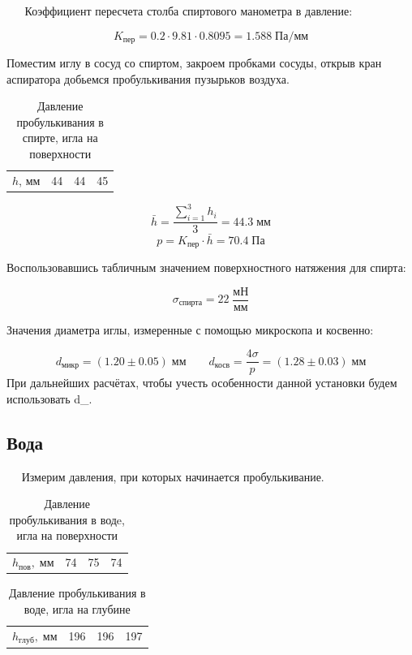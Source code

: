 \documentclass[12pt,a4paper]{article}
\begin{document}
		$\quad \;$ Коэффициент пересчета столба спиртового манометра в давление:
		
		$$K_{пер} = 0.2 \cdot 9.81 \cdot 0.8095 = 1.588 \; \text{Па}/\text{мм}$$
	
		Поместим иглу в сосуд со спиртом, закроем пробками сосуды, открыв кран аспиратора добьемся пробулькивания пузырьков воздуха.
		
		\begin{table}[h]
			\caption{Давление пробулькивания в спирте, игла на поверхности}
			\begin{tabular}{|l|lll|}
				$h$, мм & 44 & 44 & 45 \\
			\end{tabular}
		\end{table}
	
	    $$\bar{h} = \frac{\sum\limits_{i=1}^3 h_i}{3}=44.3 \; \text{мм}$$
		$$p = K_{пер} \cdot \bar{h} = 70.4 \; \text{Па}$$
		
		Воспользовавшись табличным значением поверхностного натяжения для спирта:
		
		$$\sigma_{\text{спирта}} = 22 \; \frac{\text{мН}}{\text{мм}}$$
		
		Значения диаметра иглы, измеренные с помощью микроскопа и косвенно:
		
		$$ d_{\text{микр}} = (1.20 \pm 0.05) \; \text{мм} \qquad 
		   d_{\text{косв}} = \frac{4\sigma}{p} =  (1.28 \pm 0.03) \; \text{мм} $$
		При дальнейших расчётах, чтобы учесть особенности данной установки будем использовать d_{}.
		
	\subsection*{Вода}
	
		$\quad$ Измерим давления, при которых начинается пробулькивание.
		
		\begin{table}[H]
			\caption{Давление пробулькивания в водe, игла на поверхности}
			\begin{tabular}{|l|lll|}
				$h_{пов}, \; \text{мм}$ & 74 & 75 & 74    \\
			\end{tabular}
		\end{table}
		
		\begin{table}[H]
			\caption{Давление пробулькивания в воде, игла на глубине}
			\begin{tabular}{|l|lll|}
				$h_{глуб}, \; \text{мм}$ & 196    & 196    & 197    \\
			\end{tabular}
		\end{table}
	
\end{document}
